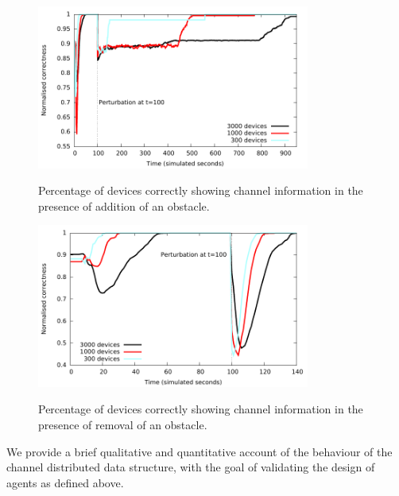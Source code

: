 \documentclass[12pt,a4paper,twoside,openright]{book}
\begin{document}
\begin{figure}
\begin{center}{\includegraphics[width=0.8\textwidth]{img/addobstacle}}\end{center}
\caption[Devices correctly building the channel, with a new obstacle]{Percentage of devices correctly showing channel information in the presence of addition of an obstacle.}
\label{f:london3}
\end{figure}

\begin{figure}
\begin{center}{\includegraphics[width=0.8\textwidth]{img/removeobstacle}}\end{center}
\caption[Devices correctly building the channel, removing an existing obstacle]{Percentage of devices correctly showing channel information in the presence of removal of an obstacle.}
\label{f:london4}
\end{figure}



We provide a brief qualitative and quantitative account of the behaviour of the channel distributed data structure, with the goal of validating the design of agents as defined above.
\end{document}
